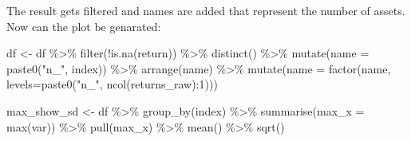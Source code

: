 \documentclass[
  oneside]{book}
\newenvironment{Shaded}{\begin{snugshade}}{\end{snugshade}}
\newcommand{\AttributeTok}[1]{\textcolor[rgb]{0.77,0.63,0.00}{#1}}
\newcommand{\DecValTok}[1]{\textcolor[rgb]{0.00,0.00,0.81}{#1}}
\newcommand{\FunctionTok}[1]{\textcolor[rgb]{0.00,0.00,0.00}{#1}}
\newcommand{\NormalTok}[1]{#1}
\newcommand{\OtherTok}[1]{\textcolor[rgb]{0.56,0.35,0.01}{#1}}
\newcommand{\SpecialCharTok}[1]{\textcolor[rgb]{0.00,0.00,0.00}{#1}}
\newcommand{\StringTok}[1]{\textcolor[rgb]{0.31,0.60,0.02}{#1}}
\begin{document}
The result gets filtered and names are added that represent the number of assets. Now can the plot be genarated:

\begin{Shaded}
\begin{Highlighting}[]
\NormalTok{df }\OtherTok{\textless{}{-}}\NormalTok{ df }\SpecialCharTok{\%\textgreater{}\%} 
  \FunctionTok{filter}\NormalTok{(}\SpecialCharTok{!}\FunctionTok{is.na}\NormalTok{(return)) }\SpecialCharTok{\%\textgreater{}\%} 
  \FunctionTok{distinct}\NormalTok{() }\SpecialCharTok{\%\textgreater{}\%} 
  \FunctionTok{mutate}\NormalTok{(}\AttributeTok{name =} \FunctionTok{paste0}\NormalTok{(}\StringTok{"n\_"}\NormalTok{, index)) }\SpecialCharTok{\%\textgreater{}\%} 
  \FunctionTok{arrange}\NormalTok{(name) }\SpecialCharTok{\%\textgreater{}\%} 
  \FunctionTok{mutate}\NormalTok{(}\AttributeTok{name =} \FunctionTok{factor}\NormalTok{(name, }\AttributeTok{levels=}\FunctionTok{paste0}\NormalTok{(}\StringTok{"n\_"}\NormalTok{, }\FunctionTok{ncol}\NormalTok{(returns\_raw)}\SpecialCharTok{:}\DecValTok{1}\NormalTok{)))}


\NormalTok{max\_show\_sd }\OtherTok{\textless{}{-}}\NormalTok{ df }\SpecialCharTok{\%\textgreater{}\%} 
  \FunctionTok{group\_by}\NormalTok{(index) }\SpecialCharTok{\%\textgreater{}\%} 
  \FunctionTok{summarise}\NormalTok{(}\AttributeTok{max\_x =} \FunctionTok{max}\NormalTok{(var)) }\SpecialCharTok{\%\textgreater{}\%} 
  \FunctionTok{pull}\NormalTok{(max\_x) }\SpecialCharTok{\%\textgreater{}\%} 
  \FunctionTok{mean}\NormalTok{() }\SpecialCharTok{\%\textgreater{}\%} 
  \FunctionTok{sqrt}\NormalTok{()}


\end{Highlighting}
\end{Shaded}
\end{document}
